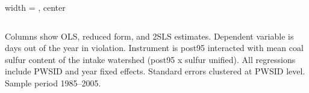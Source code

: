 \begin{table}[htbp]
\begin{adjustbox}{width = \textwidth, center}
\begin{tabular}{lcccccccccccc}
      \end{tabular}
      
      
      
   \end{adjustbox}
      {\tiny\linespread{1}\selectfont \par \raggedright 
   Columns show OLS, reduced form, and 2SLS estimates. Dependent variable is days out of the year in violation. Instrument is post95 interacted with mean coal sulfur content of the intake watershed (post95 x sulfur unified). All regressions include PWSID and year fixed effects. Standard errors clustered at PWSID level. Sample period 1985--2005.}
   
\end{table}


